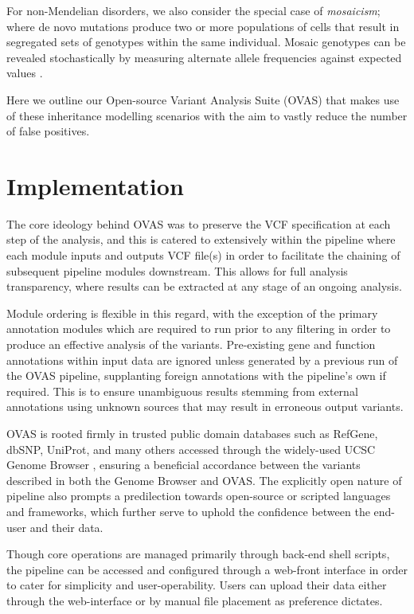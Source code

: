 \documentclass[twocolumn]{bmcart}%
\def\app{OVAS}
\begin{document}
For non-Mendelian disorders, we also consider the special case of \textit{mosaicism}; where de novo mutations produce two or more populations of cells that result in segregated sets of genotypes within the same individual. Mosaic genotypes can be revealed stochastically by measuring alternate allele frequencies against expected values \cite{biesecker2013genomic}.

Here we outline our Open-source Variant Analysis Suite (\app{}) that makes use of these inheritance modelling scenarios with the aim to vastly reduce the number of false positives.

\section*{Implementation}
The core ideology behind \app{} was to preserve the VCF specification at each step of the analysis, and this is catered to extensively within the pipeline where each module inputs and outputs VCF file(s) in order to facilitate the chaining of subsequent pipeline modules downstream. This allows for full analysis transparency, where results can be extracted at any stage of an ongoing analysis. 

Module ordering is flexible in this regard, with the exception of the primary annotation modules which are required to run prior to any filtering in order to produce an effective analysis of the variants. Pre-existing gene and function annotations within input data are ignored unless generated by a previous run of the \app{} pipeline, supplanting foreign annotations with the pipeline's own if required. This is to ensure unambiguous results stemming from external annotations using unknown sources that may result in erroneous output variants.

\app{} is rooted firmly in trusted public domain databases such as RefGene, dbSNP, UniProt, and many others accessed through the widely-used UCSC Genome Browser \cite{karolchik2003ucsc}, ensuring a beneficial accordance between the variants described in both the Genome Browser and \app{}. The explicitly open nature of pipeline also prompts a predilection towards open-source or scripted languages and frameworks, which further serve to uphold the confidence between the end-user and their data.

Though core operations are managed primarily through back-end shell scripts, the pipeline can be accessed and configured through a web-front interface in order to cater for simplicity and user-operability. Users can upload their data either through the web-interface or by manual file placement as preference dictates.
\end{document}

